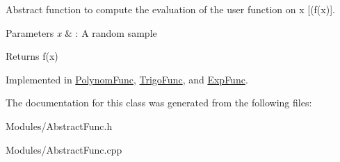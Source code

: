 Abstract function to compute the evaluation of the user function on x \mbox{[}(f(x)\mbox{]}. 


\begin{DoxyParams}{Parameters}
{\em x} & \+: A random sample \\
\hline
\end{DoxyParams}
\begin{DoxyReturn}{Returns}
f(x) 
\end{DoxyReturn}


Implemented in \hyperlink{classPolynomFunc_a9908fc0cf0686123a98d3186d481fa6f}{Polynom\+Func}, \hyperlink{classTrigoFunc_ac04acbf2d2b7301d6e2084c9bb8daab2}{Trigo\+Func}, and \hyperlink{classExpFunc_a338e91308f12a66e3d1989ed5f589626}{Exp\+Func}.



The documentation for this class was generated from the following files\+:\begin{DoxyCompactItemize}
\item 
Modules/Abstract\+Func.\+h\item 
Modules/Abstract\+Func.\+cpp\end{DoxyCompactItemize}

